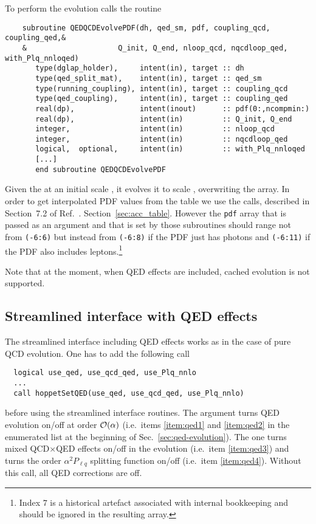 To perform the evolution  calls the routine 
\begin{lstlisting}
    subroutine QEDQCDEvolvePDF(dh, qed_sm, pdf, coupling_qcd, coupling_qed,&
    &                     Q_init, Q_end, nloop_qcd, nqcdloop_qed, with_Plq_nnloqed)
       type(dglap_holder),     intent(in), target :: dh
       type(qed_split_mat),    intent(in), target :: qed_sm
       type(running_coupling), intent(in), target :: coupling_qcd
       type(qed_coupling),     intent(in), target :: coupling_qed
       real(dp),               intent(inout)      :: pdf(0:,ncompmin:)
       real(dp),               intent(in)         :: Q_init, Q_end
       integer,                intent(in)         :: nloop_qcd
       integer,                intent(in)         :: nqcdloop_qed
       logical,  optional,     intent(in)         :: with_Plq_nnloqed
       [...]
       end subroutine QEDQCDEvolvePDF
\end{lstlisting}
Given the  at an initial scale , it
evolves it to scale , overwriting the  array. 
%
In order to get interpolated PDF values from the table we use the
 calls, described in
\ifreleasenote
Section~7.2 of Ref.~\cite{Salam:2008qg}.
\else
Section~\ref{sec:acc_table}.
\fi
%
However the \texttt{pdf} array that is passed as an argument and that
is set by those subroutines should range not from \texttt{(-6:6)} but
instead from \texttt{(-6:8)} if the PDF just has photons and
\texttt{(-6:11)} if the PDF also includes leptons.\footnote{Index $7$
is a historical artefact associated with internal \hoppet bookkeeping
and should be ignored in the resulting  array.}

Note that at the moment, when QED effects are included, cached
evolution is not supported.


\subsection{Streamlined interface with QED effects}
The streamlined interface including QED effects works as in the case of pure QCD evolution.
One has to add the following call
\begin{lstlisting}
  logical use_qed, use_qcd_qed, use_Plq_nnlo
  ...
  call hoppetSetQED(use_qed, use_qcd_qed, use_Plq_nnlo)
\end{lstlisting}
before using the streamlined interface routines.
%
The  argument turns QED evolution on/off at order
${\cal O}(\alpha)$ (i.e.\ items \ref{item:qed1} and \ref{item:qed2} in
the enumerated list at the beginning of
Sec.~\ref{sec:qed-evolution}).
%
The  one turns
mixed QCD$\times$QED effects on/off in the evolution (i.e.\ item \ref{item:qed3}) and  turns 
the order $\alpha^2 P_{\ell q}$ splitting function on/off (i.e.\
item \ref{item:qed4}).
%
Without this call, all QED corrections
are off.

